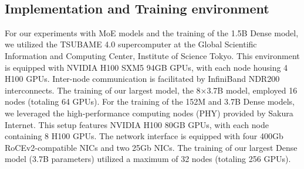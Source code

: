 





\

\subsection{Implementation and Training environment}\label{appendix:training_environment}


For our experiments with MoE models and the training of the 1.5B Dense model, we utilized the TSUBAME 4.0 supercomputer at the Global Scientific Information and Computing Center, Institute of Science Tokyo. This environment is equipped with NVIDIA H100 SXM5 94GB GPUs, with each node housing 4 H100 GPUs. Inter-node communication is facilitated by InfiniBand NDR200 interconnects. The training of our largest model, the 8×3.7B model, employed 16 nodes (totaling 64 GPUs).
For the training of the 152M and 3.7B Dense models, we leveraged the high-performance computing nodes (PHY) provided by Sakura Internet. This setup features NVIDIA H100 80GB GPUs, with each node containing 8 H100 GPUs. The network interface is equipped with four 400Gb RoCEv2-compatible NICs and two 25Gb NICs. The training of our largest Dense model (3.7B parameters) utilized a maximum of 32 nodes (totaling 256 GPUs).

